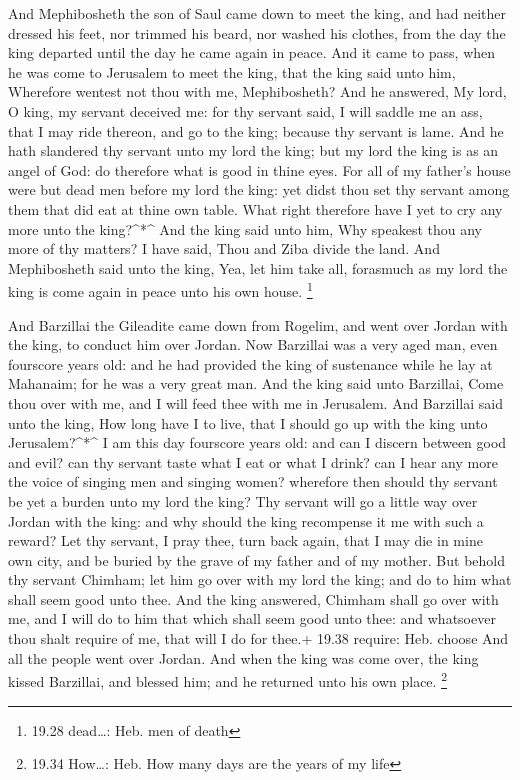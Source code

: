  And Mephibosheth the son of Saul came down to meet the
king, and had neither dressed his feet, nor trimmed his beard, nor
washed his clothes, from the day the king departed until the day he came
again in peace.  And it came to pass, when he was come to
Jerusalem to meet the king, that the king said unto him, Wherefore
wentest not thou with me, Mephibosheth?  And he answered,
My lord, O king, my servant deceived me: for thy servant said, I will
saddle me an ass, that I may ride thereon, and go to the king; because
thy servant is lame.  And he hath slandered thy servant
unto my lord the king; but my lord the king is as an angel of God: do
therefore what is good in thine eyes.  For all of my
father's house were but dead men before my lord the king: yet didst thou
set thy servant among them that did eat at thine own table. What right
therefore have I yet to cry any more unto the king?\^{}*\^{}
 And the king said unto him, Why speakest thou any more of
thy matters? I have said, Thou and Ziba divide the land. 
And Mephibosheth said unto the king, Yea, let him take all, forasmuch as
my lord the king is come again in peace unto his own house. \footnote{19.28
  dead\ldots: Heb. men of death}

 And Barzillai the Gileadite came down from Rogelim, and
went over Jordan with the king, to conduct him over Jordan.
 Now Barzillai was a very aged man, even fourscore years
old: and he had provided the king of sustenance while he lay at
Mahanaim; for he was a very great man.  And the king said
unto Barzillai, Come thou over with me, and I will feed thee with me in
Jerusalem.  And Barzillai said unto the king, How long have
I to live, that I should go up with the king unto Jerusalem?\^{}*\^{}
 I am this day fourscore years old: and can I discern
between good and evil? can thy servant taste what I eat or what I drink?
can I hear any more the voice of singing men and singing women?
wherefore then should thy servant be yet a burden unto my lord the king?
 Thy servant will go a little way over Jordan with the
king: and why should the king recompense it me with such a reward?
 Let thy servant, I pray thee, turn back again, that I may
die in mine own city, and be buried by the grave of my father and of my
mother. But behold thy servant Chimham; let him go over with my lord the
king; and do to him what shall seem good unto thee.  And
the king answered, Chimham shall go over with me, and I will do to him
that which shall seem good unto thee: and whatsoever thou shalt require
of me, that will I do for thee.+ 19.38 require: Heb. choose
 And all the people went over Jordan. And when the king was
come over, the king kissed Barzillai, and blessed him; and he returned
unto his own place. \footnote{19.34 How\ldots: Heb. How many days are
  the years of my life}

